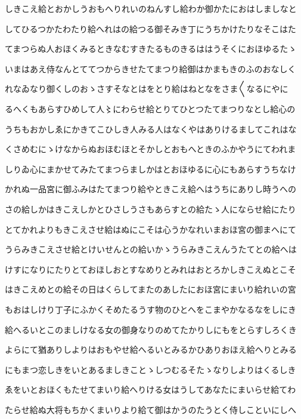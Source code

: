 \documentclass[a4paper,11pt,landscape]{ltjtarticle}
\begin{document}
しきこえ給とおかしうおもへりれいのねんすし給わか御かたにおはしましなと
\par\medskip
してひるつかたわたり給へれはの給つる御そみき丁にうちかけたりなそこはた
\par\medskip
てまつらぬ人おほくみるときなむすきたるものきるははうそくにおほゆるたゝ
\par\medskip
いまはあえ侍なんとててつからきせたてまつり給御はかまもきのふのおなしく
\par\medskip
れなゐなり御くしのおゝさすそなとはをとり給はねとなをさま〱なるにやに
\par\medskip
るへくもあらすひめして人〻にわらせ給とりてひとつたてまつりなとし給心の
\par\medskip
うちもおかしゑにかきてこひしき人みる人はなくやはありけるましてこれはな
\par\medskip
くさめむにゝけなからぬおほむほとそかしとおもへときのふかやうにてわれま
\par\medskip
しりゐ心にまかせてみたてまつらましかはとおほゆるに心にもあらすうちなけ
\par\medskip
かれぬ一品宮に御ふみはたてまつり給やときこえ給へはうちにありし時うへの
\par\medskip
さの給しかはきこえしかとひさしうさもあらすとの給たゝ人にならせ給にたり
\par\medskip
とてかれよりもきこえさせ給はぬにこそは心うかなれいまおほ宮の御まへにて
\par\medskip
うらみきこえさせ給とけいせんとの給いかゝうらみきこえんうたてとの給へは
\par\medskip
けすになりにたりとておほしおとすなめりとみれはおとろかしきこえぬとこそ
\par\medskip
はきこえめとの給その日はくらしてまたのあしたにおほ宮にまいり給れいの宮
\par\medskip
もおはしけり丁子にふかくそめたるうす物のひとへをこまやかなるなをしにき
\par\medskip
給へるいとこのましけなる女の御身なりのめてたかりしにもをとらすしろくき
\par\medskip
よらにて猶ありしよりはおもやせ給へるいとみるかひありおほえ給へりとみる
\par\medskip
にもまつ恋しきをいとあるましきことゝしつむるそたゝなりしよりはくるしき
\par\medskip
ゑをいとおほくもたせてまいり給へりける女はうしてあなたにまいらせ給てわ
\par\medskip
たらせ給ぬ大将もちかくまいりより給て御はかうのたうとく侍しこといにしへ
\par\medskip
\end{document}

